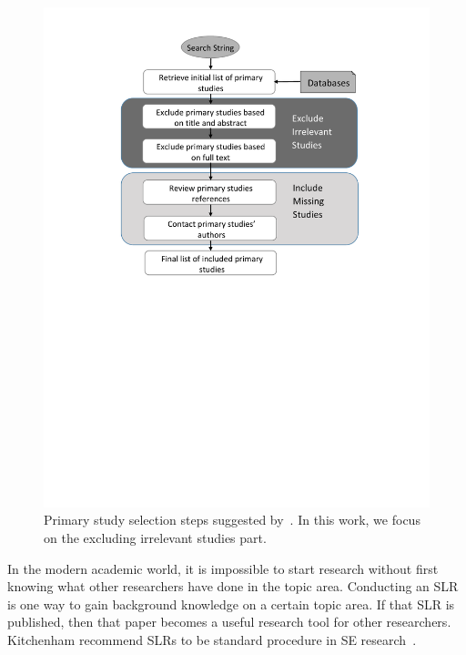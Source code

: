 \documentclass{svjour3}
\theoremstyle{break}
\begin{document}
\begin{figure}[t]
\begin{minipage}[t]{.45\linewidth}
    \includegraphics[width=\linewidth]{primary_study_selection.pdf}
    \caption{Primary study selection steps suggested by~\cite{keele2007guidelines}. In this work, we focus on the excluding irrelevant studies part.}
    \label{fig: prime}
    \end{minipage}
\end{figure}



In the modern academic world, it is
impossible to start research without first knowing what other researchers have
done in the topic area. Conducting an SLR is one way to gain
background knowledge on a certain topic area.
If that SLR is published, then that paper becomes a useful research tool
for other researchers.  Kitchenham recommend SLRs to be standard
procedure in SE research~\cite{kitchenham2004evidence,keele2007guidelines}.
\end{document}
